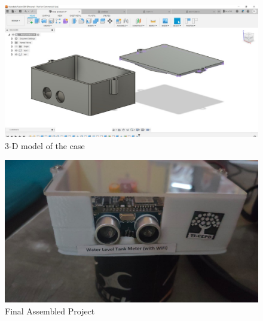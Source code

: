 \documentclass[12pt]{article}
\begin{document}
\begin{figure}[H]
\centering
    \includegraphics[scale=0.30]{3d_model1.jpg}
    \caption{3-D model of the case }
\end{figure}
\begin{figure}[H]
\centering
    \includegraphics[scale=0.20]{final1.jpg}
    \caption{Final Assembled Project}
\end{figure}
\end{document}
